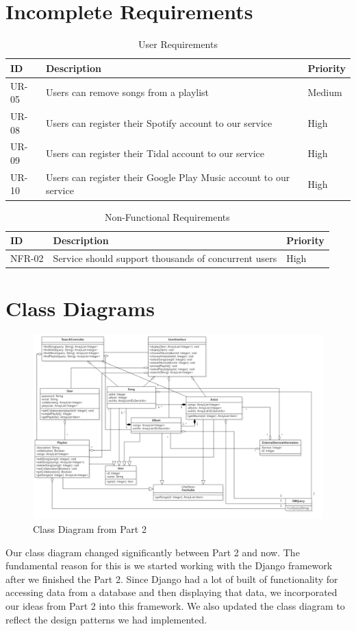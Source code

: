 \documentclass[12pt]{article}
\begin{document}
	\section{Incomplete Requirements}
	\begin{table}[H]
		\centering
		\label{tab:uri}
		\caption*{User Requirements}
		\begin{tabularx}{450pt}{lXl}
			ID & Description & Priority\\\hline
			UR-05 & Users can remove songs from a playlist & Medium \\
			UR-08 & Users can register their Spotify account to our service & High \\
			UR-09 & Users can register their Tidal account to our service & High \\
			UR-10 & Users can register their Google Play Music account to our service & High \\
		\end{tabularx}
	\end{table}
	\begin{table}[H]
		\centering
		\label{tab:nfri}
		\caption*{Non-Functional Requirements}
		\begin{tabularx}{450pt}{lXl}
			ID & Description & Priority\\\hline
			NFR-02 & Service should support thousands of concurrent users & High \\
		\end{tabularx}
	\end{table}
	\section{Class Diagrams}
	\begin{figure}[H]
		\centering
		\includegraphics[scale=0.35]{MusicManagerClassDiagram.png}
		\caption{Class Diagram from Part 2}
		\label{fig:classDiagPart2}
	\end{figure}
	Our class diagram changed significantly between Part 2 and now. The fundamental reason for this is we started working with the Django framework after we finished the Part 2. Since Django had a lot of built of functionality for accessing data from a database and then displaying that data, we incorporated our ideas from Part 2 into this framework. We also updated the class diagram to reflect the design patterns we had implemented. 
	
\end{document}
